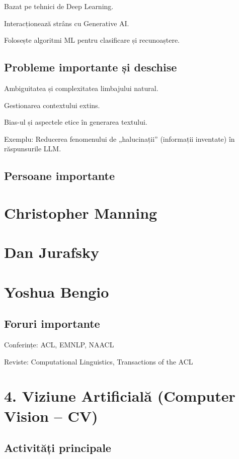 \documentclass[12pt]{article}
\begin{document}
Bazat pe tehnici de Deep Learning.

Interacționează strâns cu Generative AI.

Folosește algoritmi ML pentru clasificare și recunoaștere.

\subsection*{Probleme importante și deschise}

Ambiguitatea și complexitatea limbajului natural.

Gestionarea contextului extins.

Bias-ul și aspectele etice în generarea textului.

Exemplu: Reducerea fenomenului de „halucinații” (informații inventate) în răspunsurile LLM.

\subsection*{Persoane importante}

\section*{Christopher Manning}

\section*{Dan Jurafsky}

\section*{Yoshua Bengio}

\subsection*{Foruri importante}

Conferințe: ACL, EMNLP, NAACL

Reviste: Computational Linguistics, Transactions of the ACL

\section{4. Viziune Artificială (Computer Vision – CV)}

\subsection*{Activități principale}
\end{document}
